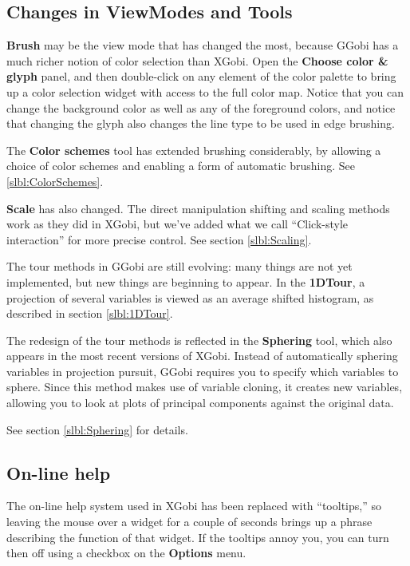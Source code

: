 \documentclass[11pt]{article}
\begin{document}
\subsection{Changes in ViewModes and Tools}

{\bf Brush} may be the view mode that has changed the most,
because GGobi has a much richer notion of color selection than
XGobi.  Open the {\bf Choose color \& glyph} panel, and then
double-click on any element of the color palette to bring up a color
selection widget with access to the full color map.  Notice that you
can change the background color as well as any of the foreground
colors, and notice that changing the glyph also changes the line
type to be used in edge brushing.

The {\bf Color schemes} tool has extended brushing considerably,
by allowing a choice of color schemes and enabling a form of
automatic brushing.  See \ref{slbl:ColorSchemes}.

{\bf Scale} has also changed.  The direct manipulation shifting and
scaling methods work as they did in XGobi, but we've added what we
call ``Click-style interaction'' for more precise control.  See section
\ref{slbl:Scaling}.

The tour methods in GGobi are still evolving: many things are not yet
implemented, but new things are beginning to appear.  In the {\bf
1DTour}, a projection of several variables is viewed as an average
shifted histogram, as described in section \ref{slbl:1DTour}.

The redesign of the tour methods is reflected in the {\bf Sphering}
tool, which also appears in the most recent versions of XGobi.
Instead of automatically sphering variables in projection pursuit,
GGobi requires you to specify which variables to sphere.  Since this
method makes use of variable cloning, it creates new variables,
allowing you to look at plots of principal components against the
original data.

See section \ref{slbl:Sphering} for details.

\subsection{On-line help}

The on-line help system used in XGobi has been replaced with
``tooltips,'' so leaving the mouse over a widget for a couple of
seconds brings up a phrase describing the function of that widget.
If the tooltips annoy you, you can turn then off using a checkbox on
the {\bf Options} menu.
\end{document}
